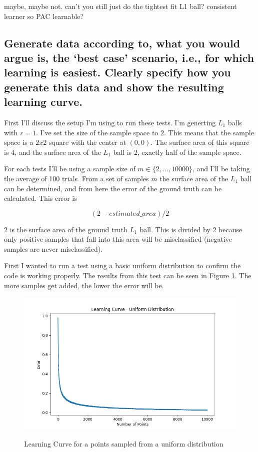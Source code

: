 \documentclass[11pt,a4paper]{article}
\begin{document}
maybe, maybe not. can't you still just do the tightest fit L1 ball?
consistent learner so PAC learnable?

\subsection{Generate data according to, what you would argue is, the ‘best case’ scenario, i.e., for
which learning is easiest. Clearly specify how you generate this data and show the resulting
learning curve.}

First I'll discuss the setup I'm using to run these tests. I'm generting $L_1$ balls with $r=1$. I've set the size of the sample space to 2. This means that the sample space is a $2x2$ square with the center at $(0,0)$. The surface area of this square is $4$, and the surface area of the $L_1$ ball is $2$, exactly half of the sample space.

For each tests I'll be using a sample size of $m \in \{2, ... , 10000 \}$, and I'll be taking the average of 100 trials. From a set of samples $m$ the surface area of the  $L_1$ ball can be determined, and from here the error of the ground truth can be calculated. This error is 

\[(2 - \textit{estimated\_area}) / 2\]

$2$ is the surface area of the ground truth $L_1$ ball. This is divided by 2 because only positive samples that fall into this area will be misclassified (negative samples are never misclassified).

First I wanted to run a test using a basic uniform distribution to confirm the code is working properly. The results from this test can be seen in Figure \ref{fig:learningcurve_uniform}. The more samples get added, the lower the error will be.

\begin{figure}[h]
    \caption{Learning Curve for a points sampled from a uniform distribution}
    \centering
    \includegraphics[width=\textwidth]{learningcurve_uniform.png}
    \label{fig:learningcurve_uniform}
\end{figure}
\end{document}
